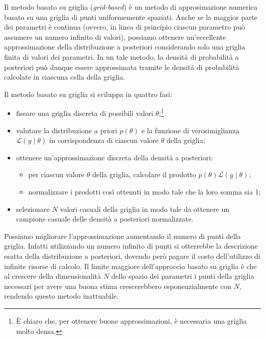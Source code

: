 \documentclass[
  11pt,
]{krantz}
\providecommand{\tightlist}{%
  \setlength{\itemsep}{0pt}\setlength{\parskip}{0pt}}
\theoremstyle{definition}
\theoremstyle{definition}
\theoremstyle{definition}
\theoremstyle{definition}
\theoremstyle{remark}
\begin{document}
Il metodo basato su griglia (\emph{grid-based}) è un metodo di approsimazione numerica basato su una griglia di punti uniformemente spaziati. Anche se la maggior parte dei parametri è continua (ovvero, in linea di principio ciascun parametro può assumere un numero infinito di valori), possiamo ottenere un'eccellente approssimazione della distribuzione a posteriori considerando solo una griglia finita di valori dei parametri. In un tale metodo, la densità di probabilità a posteriori può dunque essere approssimata tramite le densità di probabilità calcolate in ciascuna cella della griglia.

Il metodo basato su griglia si sviluppa in quattro fasi:

\begin{itemize}
\tightlist
\item
  fissare una griglia discreta di possibili valori \(\theta\);\footnote{È chiaro che, per ottenere buone approssimazioni, è necessaria una griglia molto densa.}
\item
  valutare la distribuzione a priori \(p(\theta)\) e la funzione di verosimiglianza \(\mathcal{L}(y \mid \theta)\) in corrispondenza di ciascun valore \(\theta\) della griglia;
\item
  ottenere un'approssimazione discreta della densità a posteriori:

  \begin{itemize}
  \tightlist
  \item
    per ciascun valore \(\theta\) della griglia, calcolare il prodotto \(p(\theta) \mathcal{L} (y \mid \theta)\);
  \item
    normalizzare i prodotti così ottenuti in modo tale che la loro somma sia 1;
  \end{itemize}
\item
  selezionare \(N\) valori casuali della griglia in modo tale da ottenere un campione casuale delle densità a posteriori normalizzate.
\end{itemize}

Possiamo migliorare l'approssimazione aumentando il numero di punti della griglia. Infatti utilizzando un numero infinito di punti si otterrebbe la descrizione esatta della distribuzione a posteriori, dovendo però pagare il costo dell'utilizzo di infinite risorse di calcolo. Il limite maggiore dell'approccio basato su griglia è che al crescere della dimensionalità \(N\) dello spazio dei parametri i punti della griglia necessari per avere una buona stima crescerebbero esponenzialmente con \(N\), rendendo questo metodo inattuabile.
\end{document}
